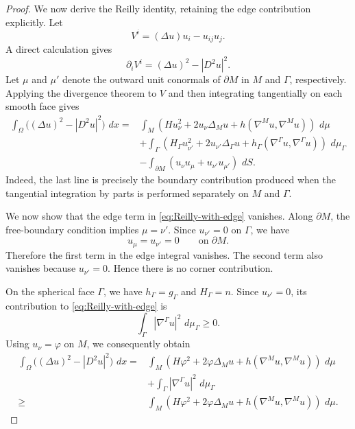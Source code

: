 \documentclass[11pt, reqno]{amsart}
\theoremstyle{remark}
\theoremstyle{definition}
\numberwithin{equation}{section}
\newcommand{\dd}{\,d}
\begin{document}
\begin{proof}
We now derive the Reilly identity, retaining the edge
contribution explicitly. Let
\begin{equation*}
    V^i=(\Delta u)u_i-u_{ij}u_j.
\end{equation*}
A direct calculation gives
\begin{equation*}
    \partial_iV^i=(\Delta u)^2-|D^2u|^2.
\end{equation*}
Let $\mu$ and $\mu'$ denote the outward unit conormals of
$\partial M$ in $M$ and $\Gamma$, respectively. Applying the
divergence theorem to $V$ and then integrating tangentially on
each smooth face gives
\begin{align}
    \int_\Omega\big((\Delta u)^2-|D^2u|^2\big)\,\dd x
    ={}&
    \int_M
    \left(
        Hu_\nu^2
        +2u_\nu\Delta_Mu
        +h(\nabla^Mu,\nabla^Mu)
    \right)\,\dd\mu
    \nonumber\\
    &+
    \int_\Gamma
    \left(
        H_\Gamma u_{\nu'}^2
        +2u_{\nu'}\Delta_\Gamma u
        +h_\Gamma(\nabla^\Gamma u,\nabla^\Gamma u)
    \right)\,\dd\mu_\Gamma
    \nonumber\\
    &-
    \int_{\partial M}
    \left(
        u_\nu u_\mu
        +u_{\nu'}u_{\mu'}
    \right)\,\dd S.
    \label{eq:Reilly-with-edge}
\end{align}
Indeed, the last line is precisely the boundary contribution
produced when the tangential integration by parts is performed
separately on $M$ and $\Gamma$.

We now show that the edge term in
\eqref{eq:Reilly-with-edge} vanishes. Along $\partial M$, the
free-boundary condition implies $\mu=\nu'$.  
Since $u_{\nu'}=0$ on $\Gamma$, we have
\begin{equation*}
    u_\mu=u_{\nu'}=0
    \qquad\text{on }\partial M.
\end{equation*}
Therefore the first term in the edge integral vanishes. The
second term also vanishes because $u_{\nu'}=0$. Hence there is no
corner contribution.

On the spherical face $\Gamma$, we have $ h_\Gamma=g_\Gamma$ and $H_\Gamma=n$. 
Since $u_{\nu'}=0$, its contribution to
\eqref{eq:Reilly-with-edge} is
\begin{equation*}
    \int_\Gamma|\nabla^\Gamma u|^2\,\dd\mu_\Gamma\geq0.
\end{equation*}
Using $u_\nu=\varphi$ on $M$, we consequently obtain
\begin{align}
    \int_\Omega\big((\Delta u)^2-|D^2u|^2\big)\,\dd x
    ={}&
    \int_M
    \left(
        H\varphi^2
        +2\varphi\Delta_Mu
        +h(\nabla^Mu,\nabla^Mu)
    \right)\,\dd\mu
    \nonumber\\
    &+
    \int_\Gamma|\nabla^\Gamma u|^2\,\dd\mu_\Gamma
    \nonumber\\
    \geq{}&
    \int_M
    \left(
        H\varphi^2
        +2\varphi\Delta_Mu
        +h(\nabla^Mu,\nabla^Mu)
    \right)\,\dd\mu.
    \label{eq:Reilly-piecewise}
\end{align}


\end{proof}
\end{document}
